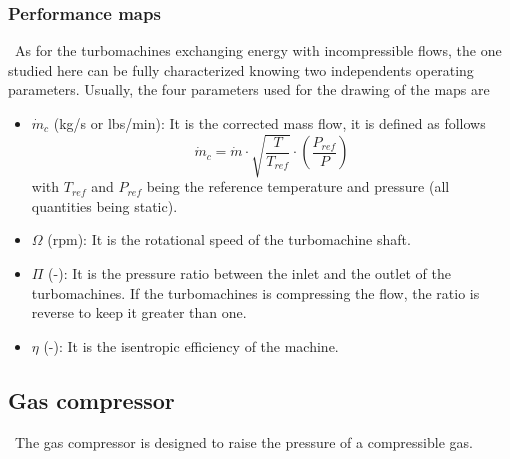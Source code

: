 \subsubsection{Performance maps}
\quad\, As for the turbomachines exchanging energy with incompressible flows, the one studied here can be fully characterized knowing two independents operating parameters. Usually, the four parameters used for the drawing of the maps are
\begin{itemize}
\item $\dot{m}_c$ (kg/s or lbs/min): It is the corrected mass flow, it is defined as follows
\begin{equation}
\dot{m}_c = \dot{m}\cdot \sqrt{\frac{T}{T_{ref}}}\cdot\left(\frac{P_{ref}}{P}\right)
\end{equation}
with $T_{ref}$ and $P_{ref}$ being the reference temperature and pressure (all quantities being static).

\item $\Omega$ (rpm): It is the rotational speed of the turbomachine shaft. 

\item $\Pi$ (-): It is the pressure ratio between the inlet and the outlet of the turbomachines. If the turbomachines is compressing the flow, the ratio is reverse to keep it greater than one.

\item $\eta$ (-): It is the isentropic efficiency of the machine.
\end{itemize} 
\subsection{Gas compressor}
\quad\, The gas compressor is designed to raise the pressure of a compressible gas. 